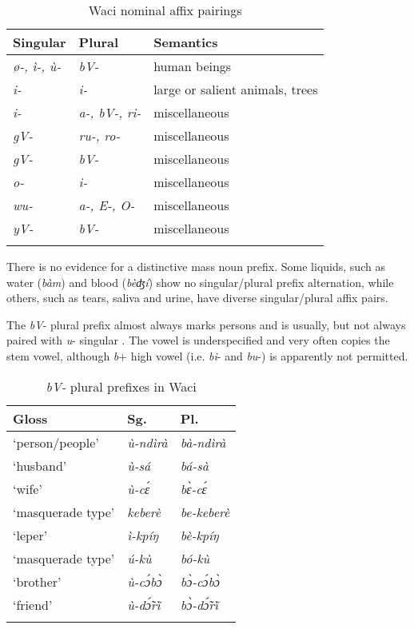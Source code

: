 \documentclass[output=paper]{langsci/langscibook}
\begin{document}
\begin{table}
\caption{\label{tab:nomaffplat:10} Waci nominal affix pairings}
\begin{tabularx}{\textwidth}{lQl}
\lsptoprule
Singular 	& Plural 	& Semantics\\
\midrule
\itshape ø-, ì-, ù- 	& \itshape bV- 	& human beings\\
\itshape i- 	& \itshape i- 	& large or salient animals, trees\\
\itshape i- 	& \itshape a-, bV-, ri- 	& miscellaneous\\
\itshape gV- 	& \itshape ru-, ro- 	& miscellaneous\\
\itshape gV- 	& \itshape bV- 	& miscellaneous\\
\itshape o- 	& \itshape i- 	& miscellaneous\\
\itshape wu- 	& \itshape a-, E-, O- 	& miscellaneous\\
\itshape yV- 	& \itshape bV- 	& miscellaneous\\
\lspbottomrule
\end{tabularx} 
\end{table}


There is no evidence for a distinctive mass noun prefix. Some liquids, such as water (\textit{bàm}) and blood (\textit{bèʤí}) show no singular/plural prefix alternation, while others, such as tears, saliva and urine, have diverse singular/plural affix pairs.

The \textit{bV}- plural prefix almost always marks persons and is usually, but not always paired with \textit{u}- singular . The vowel is underspecified and very often copies the stem vowel, although \textit{b}+ high vowel (i.e. \textit{bi}- and \textit{bu}-) is apparently not permitted.


\begin{table}
\caption{\textit{bV-} plural prefixes in Waci}
\label{extab:nomaffplat:20}
\begin{tabularx}{\textwidth}{QQl}
\lsptoprule
Gloss 	& {Sg.} 	& {Pl.}\\
\midrule
‘person/people’ 	&  \itshape ù-ndìrà 	&  \itshape bà-ndìrà\\
‘husband’ 	&  \itshape ù-sá 	&  \itshape bá-sà\\
‘wife’    	& \textit{ù-cɛ́} 	&  \itshape bɛ̀-cɛ́\\
‘masquerade type’	&  \itshape keberè 	&  \itshape be-keberè\\
‘leper’ 	&  \itshape ì-kpíŋ 	&  \itshape bè-kpíŋ\\
‘masquerade type’	&  \itshape ú-kù 	&  \itshape bó-kù\\
‘brother’ 	&  \itshape ù-cɔ́bɔ̀ 	&  \itshape bɔ̀-cɔ́bɔ̀\\
‘friend’ 	&\itshape ù-dɔ̃́rĩ̀	&  \itshape bɔ̀-dɔ̃́rĩ̀\\
 \lspbottomrule
\end{tabularx}
\end{table}
\end{document}
